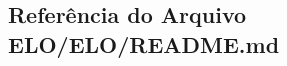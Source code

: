 \hypertarget{ELO_2ELO_2README_8md}{\subsection{Referência do Arquivo E\-L\-O/\-E\-L\-O/\-R\-E\-A\-D\-M\-E.md}
\label{ELO_2ELO_2README_8md}
}

